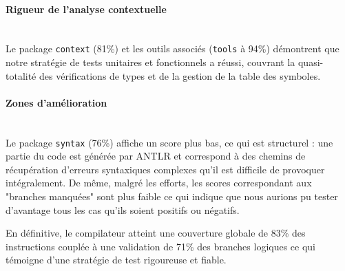 \paragraph*{Rigueur de l'analyse contextuelle} \mbox{} \\
\noindent 
Le package \texttt{context} (81\%) et les outils associés (\texttt{tools} à 94\%) démontrent que notre stratégie de tests unitaires et fonctionnels a réussi, couvrant la quasi-totalité des vérifications de types et de la gestion de la table des symboles.

\paragraph*{Zones d'amélioration} \mbox{} \\
\noindent 
Le package \texttt{syntax} (76\%) affiche un score plus bas, ce qui est structurel : une partie du code est générée par ANTLR et correspond à des chemins de récupération d'erreurs syntaxiques complexes qu'il est difficile de provoquer intégralement. De même, malgré les efforts, les scores correspondant aux "branches manquées" sont plus faible ce qui indique que nous aurions pu tester d'avantage tous les cas qu'ils soient positifs ou négatifs.

\noindent
En définitive, le compilateur atteint une couverture globale de 83\% des instructions couplée à une validation de 71\% des branches logiques ce qui témoigne d'une stratégie de test rigoureuse et fiable.
